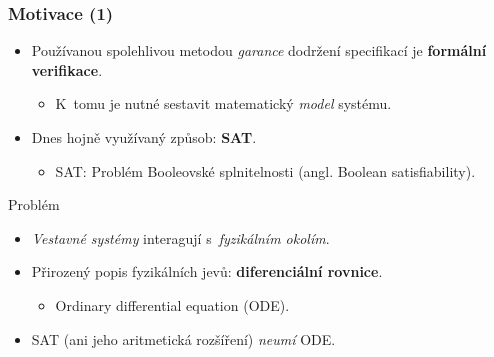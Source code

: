 \documentclass[t]{beamer}
\begin{document}
\begin{frame}\frametitle{Motivace (1)}
\begin{itemize}
\item Používanou spolehlivou metodou \textit{garance}
   dodržení specifikací je \textbf{formální verifikace}.
   \begin{itemize}
   \item K~tomu je nutné sestavit matematický \textit{model} systému.
   \end{itemize}
\item Dnes hojně využívaný způsob: \textbf{SAT}.
   \begin{itemize}
   \item SAT: Problém Booleovské splnitelnosti
      (angl. Boolean satisfiability).
   \end{itemize}
\end{itemize}

\begin{alertblock}{Problém}
\begin{itemize}
\item \textit{Vestavné systémy} interagují
   s~\textit{fyzikálním okolím}.
\item Přirozený popis fyzikálních jevů: \textbf{diferenciální rovnice}.
   \begin{itemize}
   \item Ordinary differential equation (ODE).
   \end{itemize}
\item SAT (ani jeho aritmetická rozšíření) \textit{neumí} ODE.
\end{itemize}
\end{alertblock} %
\end{frame}

\end{document}
